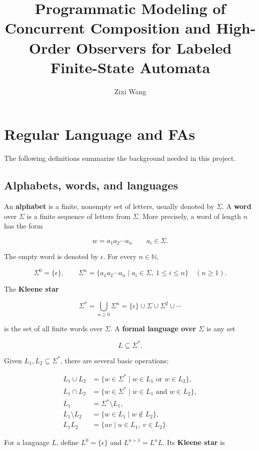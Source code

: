 \documentclass[11pt]{article}
\title{Programmatic Modeling of Concurrent Composition and High-Order Observers for Labeled Finite-State Automata}
\author{Zixi Wang}
\date{}
\begin{document}
\maketitle

\tableofcontents
\newpage

\section{Regular Language and FAs}


The following definitions summarize the background needed in this project.

\subsection{Alphabets, words, and languages}


An \textbf{alphabet} is a finite, nonempty set of letters, usually denoted by $\Sigma$. A \textbf{word} over $\Sigma$ is a finite sequence of letters from $\Sigma$. More precisely, a word of length $n$ has the form

\[
w=a_1a_2\cdots a_n
\qquad a_i\in\Sigma.
\]

The empty word is denoted by $\epsilon$. For every $n\in\mathbb{N}$,

\[
\Sigma^0=\{\epsilon\},\qquad
\Sigma^n=\{a_1a_2\cdots a_n\mid a_i\in\Sigma,\ 1\leq i\leq n\}
\quad(n\geq 1).
\]

The \textbf{Kleene star}

\[
\Sigma^*=\bigcup_{n\geq 0}\Sigma^n
=\{\epsilon\}\cup\Sigma\cup\Sigma^2\cup\cdots
\]

is the set of all finite words over $\Sigma$. A \textbf{formal language over $\Sigma$} is any set

\[
L\subseteq\Sigma^*.
\]

Given $L_1,L_2\subseteq\Sigma^*$, there are several basic operations:

\[
\begin{aligned}
L_1\cup L_2
  &=\{w\in\Sigma^*\mid w\in L_1\text{ or }w\in L_2\},\\
L_1\cap L_2
  &=\{w\in\Sigma^*\mid w\in L_1\text{ and }w\in L_2\},\\
\overline{L_1}
  &=\Sigma^*\setminus L_1,\\
L_1\setminus L_2
  &=\{w\in L_1\mid w\notin L_2\},\\
L_1L_2
  &=\{uv\mid u\in L_1,\ v\in L_2\}.
\end{aligned}
\]

For a language $L$, define $L^0=\{\epsilon\}$ and $L^{n+1}=L^nL$. Its \textbf{Kleene star} is
\end{document}
